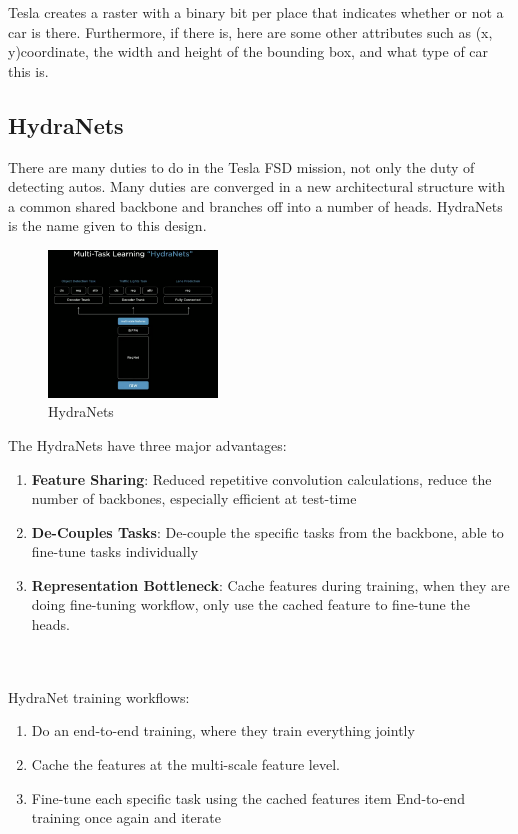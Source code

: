 \documentclass[letterpaper, 10 pt, conference]{ieeeconf}  %
\begin{document}
Tesla creates a raster with a binary bit per place that indicates whether or not a car is there. Furthermore, if there is, here are some other attributes such as (x, y)coordinate, the width and height of the bounding box, and what type of car this is.


\subsection{HydraNets}
There are many duties to do in the Tesla FSD mission, not only the duty of detecting autos. Many duties are converged in a new architectural structure with a common shared backbone and branches off into a number of heads. HydraNets is the name given to this design\cite{zhang_2021}.

\begin{figure}[hbt!]
\centering
\includegraphics[width=0.4\textwidth]{gfx/hydranets.png}
\caption{HydraNets}
\label{hydranets}
\end{figure}

The HydraNets have three major advantages:
\begin{enumerate}
    \item \textbf{Feature Sharing}: Reduced repetitive convolution calculations, reduce the number of backbones, especially efficient at test-time
    \item \textbf{De-Couples Tasks}: De-couple the specific tasks from the backbone, able to fine-tune tasks individually
    \item \textbf{Representation Bottleneck}: Cache features during training, when they are doing fine-tuning workflow, only use the cached feature to fine-tune the heads.
\end{enumerate}
\\ \hspace*{\fill} \\
HydraNet training workflows:
\begin{enumerate}
\item Do an end-to-end training, where they train everything jointly
\item Cache the features at the multi-scale feature level.
\item Fine-tune each specific task using the cached features
item End-to-end training once again and iterate
\end{enumerate}
\end{document}
